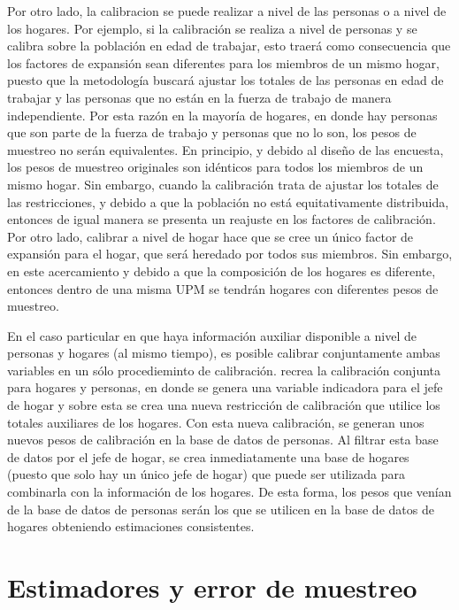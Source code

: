 \documentclass[12pt,spanish,]{book}
\begin{document}
Por otro lado, la calibracion se puede realizar a nivel de las personas o a nivel de los hogares. Por ejemplo, si la calibración se realiza a nivel de personas y se calibra sobre la población en edad de trabajar, esto traerá como consecuencia que los factores de expansión sean diferentes para los miembros de un mismo hogar, puesto que la metodología buscará ajustar los totales de las personas en edad de trabajar y las personas que no están en la fuerza de trabajo de manera independiente. Por esta razón en la mayoría de hogares, en donde hay personas que son parte de la fuerza de trabajo y personas que no lo son, los pesos de muestreo no serán equivalentes. En principio, y debido al diseño de las encuesta, los pesos de muestreo originales son idénticos para todos los miembros de un mismo hogar. Sin embargo, cuando la calibración trata de ajustar los totales de las restricciones, y debido a que la población no está equitativamente distribuida, entonces de igual manera se presenta un reajuste en los factores de calibración. Por otro lado, calibrar a nivel de hogar hace que se cree un único factor de expansión para el hogar, que será heredado por todos sus miembros. Sin embargo, en este acercamiento y debido a que la composición de los hogares es diferente, entonces dentro de una misma UPM se tendrán hogares con diferentes pesos de muestreo.

En el caso particular en que haya información auxiliar disponible a nivel de personas y hogares (al mismo tiempo), es posible calibrar conjuntamente ambas variables en un sólo procedieminto de calibración. \textcite[sec.~5]{Estevao_Sarndal_2006} recrea la calibración conjunta para hogares y personas, en donde se genera una variable indicadora para el jefe de hogar y sobre esta se crea una nueva restricción de calibración que utilice los totales auxiliares de los hogares. Con esta nueva calibración, se generan unos nuevos pesos de calibración en la base de datos de personas. Al filtrar esta base de datos por el jefe de hogar, se crea inmediatamente una base de hogares (puesto que solo hay un único jefe de hogar) que puede ser utilizada para combinarla con la información de los hogares. De esta forma, los pesos que venían de la base de datos de personas serán los que se utilicen en la base de datos de hogares obteniendo estimaciones consistentes.

\hypertarget{estimadores-y-error-de-muestreo}{%
\chapter{Estimadores y error de muestreo}\label{estimadores-y-error-de-muestreo}}
\end{document}
